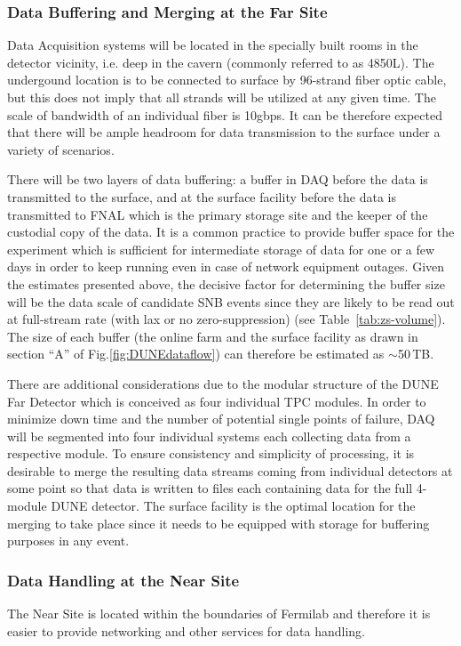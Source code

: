 \subsubsection{Data Buffering and Merging at the Far Site}
Data Acquisition systems will be located in the specially built rooms in the detector vicinity, i.e. deep in the cavern (commonly referred to as 4850L).
The undergound location is to be connected to surface by 96-strand fiber optic cable, but this does not imply that all strands will be
utilized at any given time. The scale of bandwidth of an individual fiber is 10gbps. It can be therefore expected that there will be ample headroom
for data transmission to the surface under a variety of scenarios.

There will be two layers of data buffering: a buffer in DAQ before the data is transmitted to the surface,
and at the surface facility before the data is transmitted to FNAL which is the primary storage site and the
keeper of the custodial copy of the data. It is a common practice to provide buffer space for the experiment
which is sufficient for intermediate storage of data for one or a few days in order to keep running even in case
of network equipment outages. Given the estimates presented above, the decisive factor for determining the buffer
size will be the data scale of candidate SNB events since they are likely to be read out at full-stream rate (with lax or
no zero-suppression) (see Table~\ref{tab:zs-volume}). The size of each buffer (the online farm and the surface facility
as drawn in section ``A'' of Fig.\ref{fig:DUNEdataflow}) can therefore be estimated as $\sim$50\,TB.

 There are additional considerations due to the modular structure of the DUNE Far Detector
which is conceived as four individual TPC modules. In order to minimize down time and the number of potential single points of failure,
DAQ will be segmented into four individual  systems each collecting data from a respective module. To ensure
consistency and simplicity of processing, it is desirable to merge the resulting data streams coming from individual detectors at some point
so that data is written to files each containing data for the full 4-module DUNE detector. The surface facility is the optimal location
for the merging to take place since it needs to be equipped with storage for buffering purposes in any event.

\subsubsection{Data Handling at the Near Site}
The Near Site is located within the boundaries of Fermilab and therefore it is easier to provide networking and other services for data handling.

